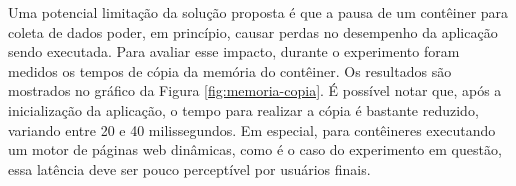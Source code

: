 %
%
%

Uma potencial limitação da solução proposta é que a pausa de um contêiner para coleta de dados poder, em princípio, causar perdas no desempenho da aplicação sendo executada. 
%
Para avaliar esse impacto, durante o experimento foram medidos os tempos de cópia da memória do contêiner.
%
Os resultados são mostrados no gráfico da Figura \ref{fig:memoria-copia}.
%
É possível notar que, após a inicialização da aplicação, o tempo para realizar a cópia é bastante reduzido, variando entre 20 e 40 milissegundos. 
%
Em especial, para contêineres executando um motor de páginas web dinâmicas, como é o caso do experimento em questão, essa latência deve ser pouco perceptível por usuários finais.


%

